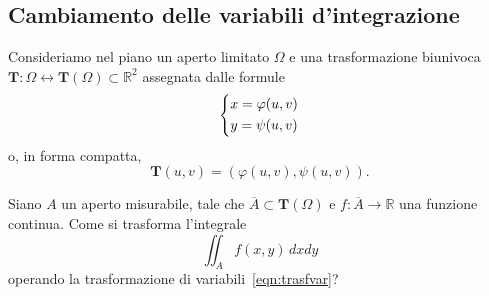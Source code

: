 \documentclass[a4paper]{book}
\numberwithin{equation}{section}
\renewcommand{\phi}{\varphi}
\theoremstyle{plain}
\theoremstyle{definition}
\theoremstyle{remark}
\theoremstyle{example}
\begin{document}
\subsection{Cambiamento delle variabili d'integrazione}
Consideriamo nel piano un aperto limitato $\Omega$ e una trasformazione biunivoca $\mathbf{T} \colon \Omega \leftrightarrow \mathbf{T}(\Omega) \subset \mathbb{R}^2$ assegnata dalle formule
\begin{equation}
	\label{eqn:trasfvar}
	\begin{dcases}
		x = \phi(u, v) \\
		y = \psi(u, v)
	\end{dcases}
\end{equation}
o, in forma compatta,
\begin{equation*}
	\mathbf{T}(u, v) = (\phi(u, v), \psi(u, v)).
\end{equation*}

Siano $A$ un aperto misurabile, tale che $\overline{A} \subset \mathbf{T}(\Omega)$ e $f\colon \overline{A} \to \mathbb{R}$ una funzione continua. Come si trasforma l'integrale
\begin{equation}
	\iint_A f(x, y) \,dxdy
\end{equation}
operando la trasformazione di variabili~\eqref{eqn:trasfvar}?
\end{document}
